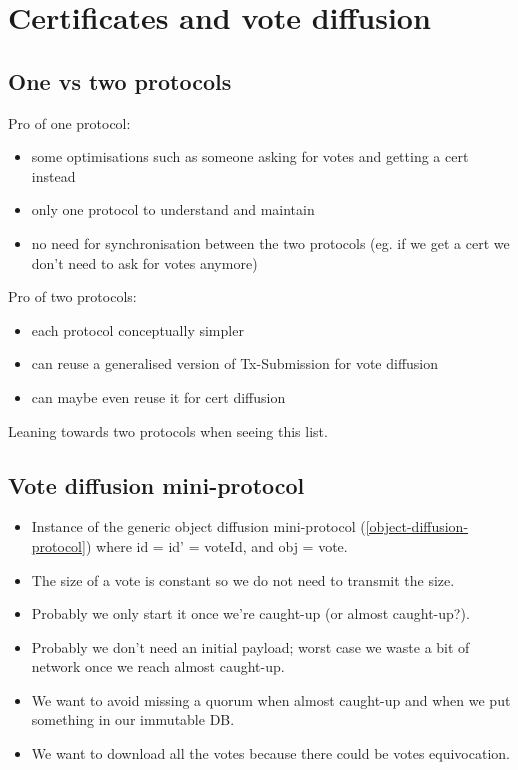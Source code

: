 \section{Certificates and vote diffusion}


\subsection{One vs two protocols}

Pro of one protocol:
\begin{itemize}
\item some optimisations such as someone asking for votes and getting a cert
  instead
\item only one protocol to understand and maintain
\item no need for synchronisation between the two protocols (eg. if we get a
  cert we don’t need to ask for votes anymore)
\end{itemize}

Pro of two protocols:
\begin{itemize}
\item each protocol conceptually simpler
\item can reuse a generalised version of Tx-Submission for vote diffusion
\item can maybe even reuse it for cert diffusion
\end{itemize}

Leaning towards two protocols when seeing this list.

\subsection{Vote diffusion mini-protocol}

\begin{itemize}
\item Instance of the generic object diffusion mini-protocol
  (\autoref{object-diffusion-protocol}) where id = id’ = voteId, and obj = vote.

\item The size of a vote is constant so we do not need to transmit the size.

\item Probably we only start it once we’re caught-up (or almost caught-up?).

\item Probably we don’t need an initial payload; worst case we waste a bit of
  network once we reach almost caught-up.

\item We want to avoid missing a quorum when almost caught-up and when we put
  something in our immutable DB.

\item We want to download all the votes because there could be votes
  equivocation.
\end{itemize}

